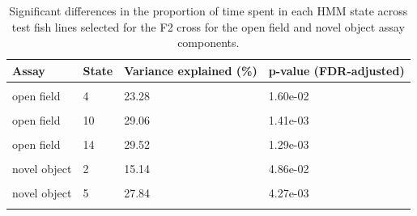 \documentclass[
]{book}
\begin{document}
\begin{table}

\caption{\label{tab:mikk-dge-F0}Significant differences in the proportion of time spent in each HMM state across test fish lines selected for the F2 cross for the open field and novel object assay components.}
\centering
\begin{tabular}[t]{llll}
\toprule
Assay & State & Variance explained (\%) & p-value (FDR-adjusted)\\
\midrule
\cellcolor{gray!6}{open field} & \cellcolor{gray!6}{3} & \cellcolor{gray!6}{21.53} & \cellcolor{gray!6}{2.67e-03}\\
open field & 4 & 23.28 & 1.60e-02\\
\cellcolor{gray!6}{open field} & \cellcolor{gray!6}{5} & \cellcolor{gray!6}{20.61} & \cellcolor{gray!6}{3.15e-02}\\
open field & 10 & 29.06 & 1.41e-03\\
\cellcolor{gray!6}{open field} & \cellcolor{gray!6}{12} & \cellcolor{gray!6}{24.91} & \cellcolor{gray!6}{1.45e-02}\\
\addlinespace
open field & 14 & 29.52 & 1.29e-03\\
\cellcolor{gray!6}{novel object} & \cellcolor{gray!6}{1} & \cellcolor{gray!6}{16.21} & \cellcolor{gray!6}{1.90e-02}\\
novel object & 2 & 15.14 & 4.86e-02\\
\cellcolor{gray!6}{novel object} & \cellcolor{gray!6}{4} & \cellcolor{gray!6}{26.90} & \cellcolor{gray!6}{5.21e-03}\\
novel object & 5 & 27.84 & 4.27e-03\\
\addlinespace
\cellcolor{gray!6}{novel object} & \cellcolor{gray!6}{10} & \cellcolor{gray!6}{23.73} & \cellcolor{gray!6}{2.81e-02}\\
\bottomrule
\end{tabular}
\end{table}
\end{document}

